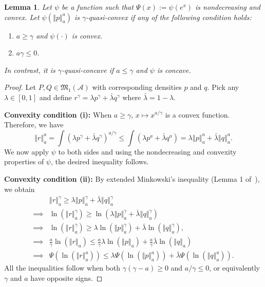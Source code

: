 \documentclass[11pt]{article}
\theoremstyle{plain}
\newtheorem{lemma}[theorem]{Lemma}
\theoremstyle{remark}
\newcommand{\Acal}{\mathcal{A}}
\newcommand{\Mfrak}{\mathfrak{M}}
\newcommand{\norm}[1]{\left\Vert #1 \right\Vert}
\begin{document}
\begin{lemma}\label{lem:convex-psi}
    Let $\psi$ be a function such that $\Psi(x) := \psi(e^x)$ is nondecreasing and convex. Let $\psi(\norm{p}_a^a)$ is $\gamma$-quasi-convex if any of the following condition holds:
    \begin{enumerate}
        \item[(i)] $a \geq \gamma$ and $\psi(\cdot)$ is convex.
        \item[(ii)] $a\gamma \leq 0$.
    \end{enumerate}
    \noindent In contrast, it is $\gamma$-quasi-concave if $a \leq \gamma$ and $\psi$ is concave.
\end{lemma}

\begin{proof}
    Let $P, Q \in \Mfrak_1(\Acal)$ with corresponding densities $p$ and $q$. Pick any $\lambda \in [0, 1]$ and define $r^\gamma = \lambda p^\gamma + \bar{\lambda}q^\gamma$ where $\bar{\lambda} = 1 - \lambda$.

    \noindent\textbf{Convexity condition (i):} When $a \geq \gamma$, $x \mapsto x^{a/\gamma}$ is a convex function. Therefore, we have
    \begin{equation*}
        \norm{r}_a^a = \int (\lambda p^\gamma + \bar{\lambda}q^\gamma)^{a/\gamma}
        \leq \int (\lambda p^a + \bar{\lambda} q^a)
        = \lambda \norm{p}_a^a + \bar{\lambda} \norm{q}_a^a.
    \end{equation*}
    \noindent We now apply $\psi$ to both sides and using the nondecreasing and convexity properties of $\psi$, the desired inequality follows.

    \noindent\textbf{Convexity condition (ii):} By extended Minkowski's inequality (Lemma 1 of~\cite{ghosh2018generalizedentropy}), we obtain
    \begin{align}
                 & \norm{r}_a^\gamma
        \geq \lambda \norm{p}_a^\gamma + \bar{\lambda} \norm{q}_a^\gamma\nonumber                                                                                                                 \\
        \implies & \ln(\norm{r}_a^\gamma) \geq \ln( \lambda \norm{p}_a^\gamma + \bar{\lambda} \norm{q}_a^\gamma )\nonumber                                                                        \\
        \implies & \ln(\norm{r}_a^\gamma) \geq \lambda \ln(\norm{p}_a^\gamma) + \bar{\lambda} \ln(\norm{q}_a^\gamma), \label{eqn:convex-psi-proof-1}                                              \\
        \implies & \frac{a}{\gamma}\ln(\norm{r}_a) \leq \frac{a}{\gamma} \lambda \ln(\norm{p}_a) + \frac{a}{\gamma} \bar{\lambda} \ln(\norm{q}_a)\nonumber                                        \\
        \implies & \Psi\left( \ln(\norm{r}_a^a) \right) \leq \lambda \Psi\left( \ln(\norm{p}_a^a) \right) + \bar{\lambda} \Psi\left( \ln(\norm{q}_a^a) \right).    \label{eqn:convex-psi-proof-2}
    \end{align}
    \noindent All the inequalities follow when both $\gamma(\gamma - a) \geq 0$ and $a/\gamma \leq 0$, or equivalently $\gamma$ and $a$ have opposite signs.


\end{proof}
\end{document}
